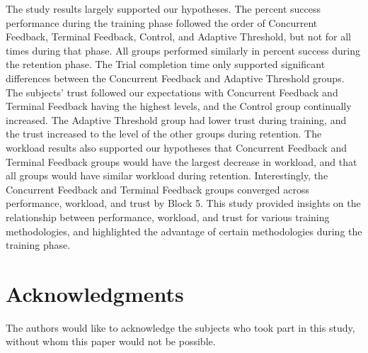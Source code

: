 The study results largely supported our hypotheses.
The percent success performance during the training phase followed the order of Concurrent Feedback, Terminal Feedback, Control, and Adaptive Threshold, but not for all times during that phase.
All groups performed similarly in percent success during the retention phase.
The Trial completion time only supported significant differences between the Concurrent Feedback and Adaptive Threshold groups.
The subjects' trust followed our expectations with Concurrent Feedback and Terminal Feedback having the highest levels, and the Control group continually increased.
The Adaptive Threshold group had lower trust during training, and the trust increased to the level of the other groups during retention.
The workload results also supported our hypotheses that Concurrent Feedback and Terminal Feedback groups would have the largest decrease in workload, and that all groups would have similar workload during retention.
Interestingly, the Concurrent Feedback and Terminal Feedback groups converged across performance, workload, and trust by Block 5.
This study provided insights on the relationship between performance, workload, and trust for various training methodologies, and highlighted the advantage of certain methodologies during the training phase.

\section*{Acknowledgments}
The authors would like to acknowledge the subjects who took part in this study, without whom this paper would not be possible.

% 

% 
